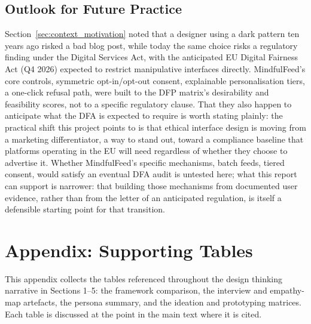 \documentclass[11pt]{article}
\begin{document}
\subsection{Outlook for Future Practice}
Section~\ref{sec:context_motivation} noted that a designer using a dark pattern ten years ago risked a bad blog post, while today the same choice risks a regulatory finding under the Digital Services Act, with the anticipated EU Digital Fairness Act (Q4 2026) expected to restrict manipulative interfaces directly. MindfulFeed's core controls, symmetric opt-in/opt-out consent, explainable personalisation tiers, a one-click refusal path, were built to the DFP matrix's desirability and feasibility scores, not to a specific regulatory clause. That they also happen to anticipate what the DFA is expected to require is worth stating plainly: the practical shift this project points to is that ethical interface design is moving from a marketing differentiator, a way to stand out, toward a compliance baseline that platforms operating in the EU will need regardless of whether they choose to advertise it. Whether MindfulFeed's specific mechanisms, batch feeds, tiered consent, would satisfy an eventual DFA audit is untested here; what this report can support is narrower: that building those mechanisms from documented user evidence, rather than from the letter of an anticipated regulation, is itself a defensible starting point for that transition.

\clearpage
\printbibliography

\clearpage
\appendix
\section{Appendix: Supporting Tables}
\label{sec:appendix_tables}
This appendix collects the tables referenced throughout the design thinking narrative in Sections 1--5: the framework comparison, the interview and empathy-map artefacts, the persona summary, and the ideation and prototyping matrices. Each table is discussed at the point in the main text where it is cited.
\end{document}
